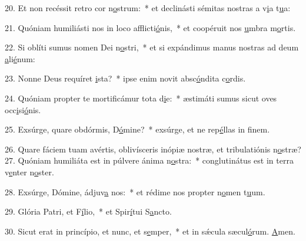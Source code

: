 20. Et non recéssit retro cor n\uline{o}strum:~* et declinásti sémitas nostras a v\uline{i}a t\uline{u}a:\par 
21. Quóniam humiliásti nos in loco afflicti\uline{ó}nis,~* et coopéruit nos \uline{u}mbra m\uline{o}rtis.\par 
22. Si oblíti sumus nomen Dei n\uline{o}stri,~* et si expándimus manus nostras ad deum \uline{a}li\uline{é}num:\par 
23. Nonne Deus requíret \uline{i}sta?~* ipse enim novit absc\uline{ó}ndita c\uline{o}rdis.\par 
24. Quóniam propter te mortificámur tota d\uline{i}e:~* æstimáti sumus sicut oves occ\uline{i}si\uline{ó}nis.\par 
25. Exsúrge, quare obdórmis, D\uline{ó}mine?~* exsúrge, et ne rep\uline{é}llas in f\uline{i}nem.\par 
26. Quare fáciem tuam avértis, oblivísceris inópiæ nostræ, et tribulatiónis n\uline{o}stræ?
27. Quóniam humiliáta est in púlvere ánima n\uline{o}stra:~* conglutinátus est in terra v\uline{e}nter n\uline{o}ster.\par 
28. Exsúrge, Dómine, ádjuv\uline{a} nos:~* et rédime nos propter n\uline{o}men t\uline{u}um.\par 
29. Glória Patri, et F\uline{í}lio,~* et Spir\uline{í}tui S\uline{a}ncto.\par 
30. Sicut erat in princípio, et nunc, et s\uline{e}mper,~* et in sǽcula sæcul\uline{ó}rum. \uline{A}men.\par 
